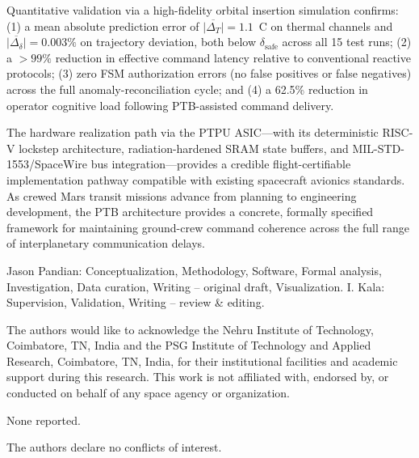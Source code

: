 \documentclass[ASNA,twocolumn]{USG}
\begin{document}
Quantitative validation via a high-fidelity orbital insertion simulation confirms: (1) a mean absolute
prediction error of \(\overline{|\Delta_T|} = 1.1\)~\textdegree C on thermal channels and
\(\overline{|\Delta_\delta|} = 0.003\%\) on trajectory deviation, both below \(\delta_\text{safe}\)
across all 15 test runs; (2) a \(>99\%\) reduction in effective command latency relative to conventional
reactive protocols; (3) zero FSM authorization errors (no false positives or false negatives) across the
full anomaly-reconciliation cycle; and (4) a 62.5\% reduction in operator cognitive load following
PTB-assisted command delivery.

The hardware realization path via the PTPU ASIC---with its deterministic RISC-V lockstep architecture,
radiation-hardened SRAM state buffers, and MIL-STD-1553/SpaceWire bus integration---provides a credible
flight-certifiable implementation pathway compatible with existing spacecraft avionics standards.
As crewed Mars transit missions advance from planning to engineering development, the PTB architecture
provides a concrete, formally specified framework for maintaining ground-crew command coherence across
the full range of interplanetary communication delays.



Jason Pandian: Conceptualization, Methodology, Software, Formal analysis, Investigation, Data curation, Writing -- original draft, Visualization. I. Kala: Supervision, Validation, Writing -- review \& editing.

The authors would like to acknowledge the Nehru Institute of Technology, Coimbatore, TN, India and the PSG Institute of Technology and Applied Research, Coimbatore, TN, India, for their institutional facilities and academic support during this research.
This work is not affiliated with, endorsed by, or conducted on behalf of any space agency or organization.

None reported.

The authors declare no conflicts of interest.



\end{document}

